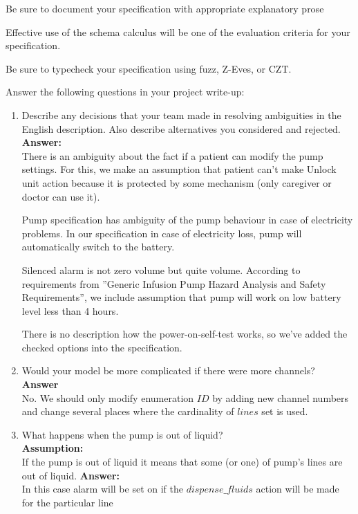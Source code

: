 \documentclass{article}
\begin{document}
\bigskip Be sure to document your specification with appropriate explanatory prose

\bigskip Effective use of the schema calculus will be one of the evaluation criteria for your specification.

\bigskip Be sure to typecheck your specification using fuzz,
Z-Eves, or CZT.

\bigskip Answer the following questions in your project write-up:
\begin{enumerate}
    \item Describe any decisions that your team made in resolving
    ambiguities in the English description. Also describe
    alternatives you considered and rejected.
    \\
    \textbf{Answer:}\\
    
   There is an ambiguity about the fact if a patient can modify the pump settings. For this, we make an assumption that patient can't make Unlock unit action because it is protected by some mechanism (only caregiver or doctor can use it).
    
    Pump specification has ambiguity of the pump behaviour in case of electricity problems. In our specification in case of electricity loss, pump will automatically switch to the battery.
    
    Silenced alarm is not zero volume but quite volume.
    According to requirements from ”Generic Infusion Pump Hazard Analysis and Safety Requirements”, we include assumption that pump will work on low battery level less than 4 hours.
    
	There is no description how the power-on-self-test works, so we've added the checked options into the specification.
 
    \item Would your model be more complicated if there were more
    channels?
    \\
    \textbf{Answer}\\
    No. We should only modify enumeration $ID$ by adding new channel numbers and change several places where the cardinality of $lines$ set is used.
    \item What happens when the pump is out of liquid?
    \\
    \textbf{Assumption:}\\
    If the pump is out of liquid it means that some (or one) of pump's lines are out of liquid.
    \textbf{Answer:}\\
    In this case alarm will be set on if the $dispense\_fluids$ action will be made for the particular line 
    

\end{enumerate}
\end{document}
